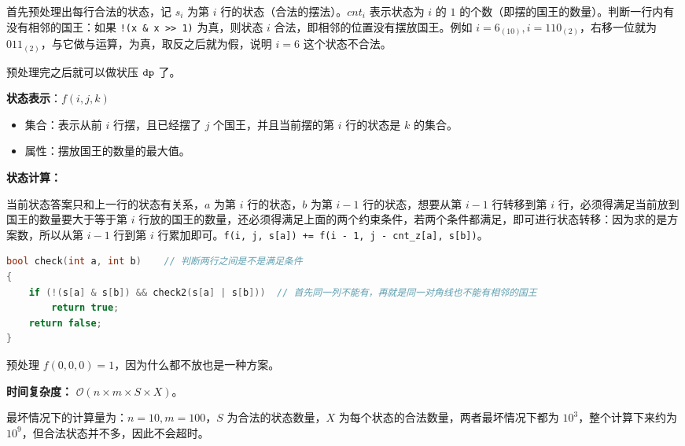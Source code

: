 首先预处理出每行合法的状态，记 $s_i$ 为第 $i$ 行的状态（合法的摆法）。$cnt_i$ 表示状态为 $i$ 的 $1$ 的个数（即摆的国王的数量）。判断一行内有没有相邻的国王：如果 \verb|!(x & x >> 1)| 为真，则状态 $i$ 合法，即相邻的位置没有摆放国王。例如 $i = 6_{(10)}, i = 110_{(2)}$，右移一位就为 $011_{(2)}$，与它做与运算，为真，取反之后就为假，说明 $i = 6$ 这个状态不合法。

预处理完之后就可以做状压 $\tt dp$ 了。

\textbf{状态表示}：$f(i, j, k)$
\begin{itemize}
\item 集合：表示从前 $i$ 行摆，且已经摆了 $j$ 个国王，并且当前摆的第 $i$ 行的状态是 $k$ 的集合。
\item 属性：摆放国王的数量的最大值。
\end{itemize}

\textbf{状态计算：}

当前状态答案只和上一行的状态有关系，$a$ 为第 $i$ 行的状态，$b$ 为第 $i-1$ 行的状态，想要从第 $i-1$ 行转移到第 $i$ 行，必须得满足当前放到国王的数量要大于等于第 $i$ 行放的国王的数量，还必须得满足上面的两个约束条件，若两个条件都满足，即可进行状态转移：因为求的是方案数，所以从第 $i - 1$ 行到第 $i$ 行累加即可。\verb|f(i, j, s[a]) += f(i - 1, j - cnt_z[a], s[b])|。

\begin{lstlisting}[language=cpp]
bool check(int a, int b)    // 判断两行之间是不是满足条件
{
    if (!(s[a] & s[b]) && check2(s[a] | s[b]))  // 首先同一列不能有，再就是同一对角线也不能有相邻的国王
        return true;
    return false;
}
\end{lstlisting}

预处理 $f(0, 0, 0) = 1$，因为什么都不放也是一种方案。

\textbf{时间复杂度：} $\mathcal{O}(n \times m \times S \times X)$。

最坏情况下的计算量为：$n = 10, m = 100$，$S$ 为合法的状态数量，$X$ 为每个状态的合法数量，两者最坏情况下都为 $10^3$，整个计算下来约为 $10^9$，但合法状态并不多，因此不会超时。

